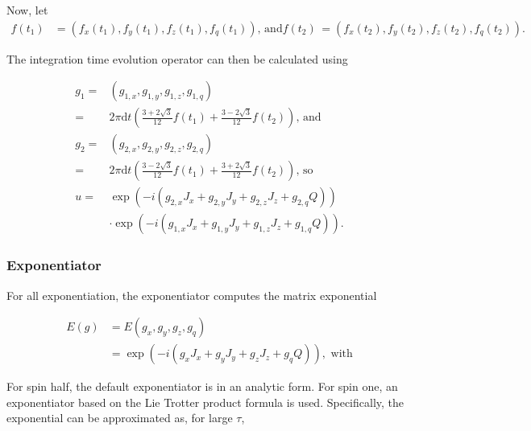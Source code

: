\documentclass{jors}
\begin{document}
			Now, let
			\begin{align}
				f(t_1) &= (f_x(t_1), f_y(t_1), f_z(t_1), f_q(t_1))\textrm{, and}
				f(t_2) &= (f_x(t_2), f_y(t_2), f_z(t_2), f_q(t_2)).
			\end{align}
			
			The integration time evolution operator can then be calculated using
			
			\begin{align}
				g_1 =& (g_{1,x}, g_{1,y}, g_{1,z}, g_{1,q})\\
				=& 2 \pi \mathrm{d}t \left(\frac{3 + 2 \sqrt{3}}{12} f(t_1) + \frac{3 - 2 \sqrt{3}}{12} f(t_2)\right)\textrm{, and}\\
				g_2 =& (g_{2,x}, g_{2,y}, g_{2,z}, g_{2,q})\\
				=& 2 \pi \mathrm{d}t \left(\frac{3 - 2 \sqrt{3}}{12} f(t_1) + \frac{3 + 2 \sqrt{3}}{12} f(t_2)\right)\textrm{, so}\\
				u =& \exp(-i \left( g_{2,x} J_x + g_{2,y} J_y + g_{2,z} J_z + g_{2,q} Q\right))\\
				&\cdot\exp(-i \left( g_{1,x} J_x + g_{1,y} J_y + g_{1,z} J_z + g_{1,q} Q\right)).
			\end{align}

		\subsubsection*{Exponentiator}
			For all exponentiation, the exponentiator computes the matrix exponential
			
			\begin{align}
				E(g) &= E(g_x, g_y, g_z, g_q)\\
				&= \exp(-i (g_x J_x + g_y J_y + g_z J_z + g_q Q)), \textrm{ with}
			\end{align}
			
			For spin half, the default exponentiator is in an analytic form. For spin one, an exponentiator based on the Lie Trotter product formula \cite{moler_nineteen_2003} is used. Specifically, the exponential can be approximated as, for large \(\tau\),
\end{document}

